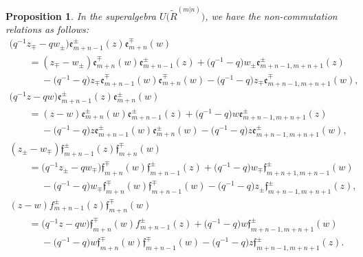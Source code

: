 \documentclass[10pt,a4paper]{amsart}
\numberwithin{equation}{section}
\newtheorem{Proposition}[Theorem]{Proposition}
 { \theoremstyle{definition}
\newtheorem{Definition}[Theorem]{Definition}
\newtheorem{Note}[Theorem]{Note}
\newtheorem{Example}[Theorem]{Example}
\newtheorem{Remark}[Theorem]{Remark} }
\begin{document}
\begin{Proposition}In the superalgebra $U\bigl(\widetilde{R}^{(m|n)}\bigr)$, we have the non-commutation relations as follows:
\begin{gather*}
 \bigl(q^{-1}z_{\mp} -qw_{\pm}\bigr)\mathfrak{e}_{m+n-1}^{\pm}(z)\mathfrak{e}_{m+n}^{\mp}(w)\\
 \qquad=(z_{\mp}-w_{\pm})\mathfrak{e}_{m+n}^{\mp}(w)\mathfrak{e}_{m+n-1}^{\pm}(z)
+\bigl(q^{-1}-q\bigr)w_{\pm} \mathfrak{e}_{m+n-1,m+n+1}^{\pm}(z)\\
\phantom{ \qquad=}{}- \bigl(q^{-1}-q\bigr)z_{\mp}\mathfrak{e}_{m+n-1}^{\mp}(w)\mathfrak{e}_{m+n}^{\mp}(w)-\bigl(q^{-1}-q\bigr)z_{\mp}\mathfrak{e}_{m+n-1,m+n+1}^{\mp}(w),
\\
 \bigl(q^{-1}z- qw\bigr)\mathfrak{e}_{m+n-1}^{\pm}(z)\mathfrak{e}_{m+n}^{\pm}(w)\\
 \qquad=(z-w)\mathfrak{e}_{m+n}^{\pm}(w)\mathfrak{e}_{m+n-1}^{\pm}(z)
+\bigl(q^{-1}-q\bigr)w\mathfrak{e}_{m+n-1,m+n+1}^{\pm}(z)
\\
\phantom{ \qquad=}{}-\bigl(q^{-1}-q\bigr)z\mathfrak{e}_{m+n-1}^{\pm}(w)\mathfrak{e}_{m+n}^{\pm}(w)-\bigl(q^{-1}-q\bigr)z\mathfrak{e}_{m+n-1,m+n+1}^{\pm}(w),
\\
 (z_{\pm}-w_{\mp} )\mathfrak{f}_{m+n-1}^{\pm}(z)\mathfrak{f}_{m+n}^{\mp}(w)\\
 \qquad=\bigl(q^{-1}z_{\pm}-qw_{\mp}\bigr)\mathfrak{f}_{m+n}^{\mp}(w)\mathfrak{f}_{m+n-1}^{\pm}(z)
+\bigl(q^{-1}-q\bigr)w_{\mp}\mathfrak{f}_{m+n+1,m+n-1}^{\pm}(w)\\
\phantom{ \qquad=}{}-\bigl(q^{-1}-q\bigr)w_{\mp}\mathfrak{f}_{m+n}^{\mp}(w)\mathfrak{f}_{m+n-1}^{\mp}(w) -\bigl(q^{-1}-q\bigr)z_{\pm}\mathfrak{f}_{m+n-1,m+n+1}^{\pm}(z),
\\
 (z-w) f_{m+n-1}^{\pm}(z)\mathfrak{f}_{m+n}^{\mp}(w)\\
\qquad =\bigl(q^{-1}z-qw\bigr)\mathfrak{f}_{m+n}^{\mp}(w)f_{m+n-1}^{\pm}(z)
+\bigl(q^{-1}-q\bigr)w\mathfrak{f}_{m+n-1,m+n+1}^{\pm}(w)
\\
 \phantom{ \qquad=}{}-\bigl(q^{-1}-q\bigr)w\mathfrak{f}_{m+n}^{\mp}(w)\mathfrak{f}_{m+n-1}^{\mp}(w)-\bigl(q^{-1}-q\bigr)z\mathfrak{f}_{m+n-1,m+n+1}^{\pm}(z).
\end{gather*}
\end{Proposition}
\end{document}
